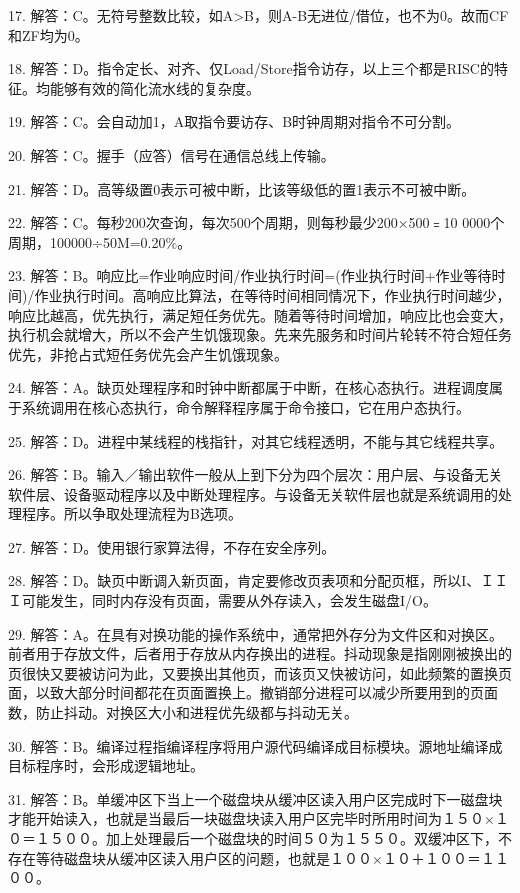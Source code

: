 17. 解答：C。无符号整数比较，如A>B，则A-B无进位/借位，也不为0。故而CF和ZF均为0。

18. 解答：D。指令定长、对齐、仅Load/Store指令访存，以上三个都是RISC的特征。均能够有效的简化流水线的复杂度。

19. 解答：C。会自动加1，A取指令要访存、B时钟周期对指令不可分割。

20. 解答：C。握手（应答）信号在通信总线上传输。

21. 解答：D。高等级置0表示可被中断，比该等级低的置1表示不可被中断。

22. 解答：C。每秒200次查询，每次500个周期，则每秒最少200×500﹦10 0000个周期，100000÷50M=0.20\%。

23. 解答：B。响应比=作业响应时间/作业执行时间=(作业执行时间+作业等待时间)/作业执行时间。高响应比算法，在等待时间相同情况下，作业执行时间越少，响应比越高，优先执行，满足短任务优先。随着等待时间增加，响应比也会变大，执行机会就增大，所以不会产生饥饿现象。先来先服务和时间片轮转不符合短任务优先，非抢占式短任务优先会产生饥饿现象。

24. 解答：A。缺页处理程序和时钟中断都属于中断，在核心态执行。进程调度属于系统调用在核心态执行，命令解释程序属于命令接口，它在用户态执行。

25. 解答：D。进程中某线程的栈指针，对其它线程透明，不能与其它线程共享。

26. 解答：B。输入／输出软件一般从上到下分为四个层次：用户层、与设备无关软件层、设备驱动程序以及中断处理程序。与设备无关软件层也就是系统调用的处理程序。所以争取处理流程为B选项。

27. 解答：D。使用银行家算法得，不存在安全序列。

28. 解答：D。缺页中断调入新页面，肯定要修改页表项和分配页框，所以I、ＩＩＩ可能发生，同时内存没有页面，需要从外存读入，会发生磁盘I/O。

29. 解答：A。在具有对换功能的操作系统中，通常把外存分为文件区和对换区。前者用于存放文件，后者用于存放从内存换出的进程。抖动现象是指刚刚被换出的页很快又要被访问为此，又要换出其他页，而该页又快被访问，如此频繁的置换页面，以致大部分时间都花在页面置换上。撤销部分进程可以减少所要用到的页面数，防止抖动。对换区大小和进程优先级都与抖动无关。

30. 解答：B。编译过程指编译程序将用户源代码编译成目标模块。源地址编译成目标程序时，会形成逻辑地址。

31. 解答：B。单缓冲区下当上一个磁盘块从缓冲区读入用户区完成时下一磁盘块才能开始读入，也就是当最后一块磁盘块读入用户区完毕时所用时间为１５０×１０＝１５００。加上处理最后一个磁盘块的时间５０为１５５０。双缓冲区下，不存在等待磁盘块从缓冲区读入用户区的问题，也就是１００×１０＋１００＝１１００。


